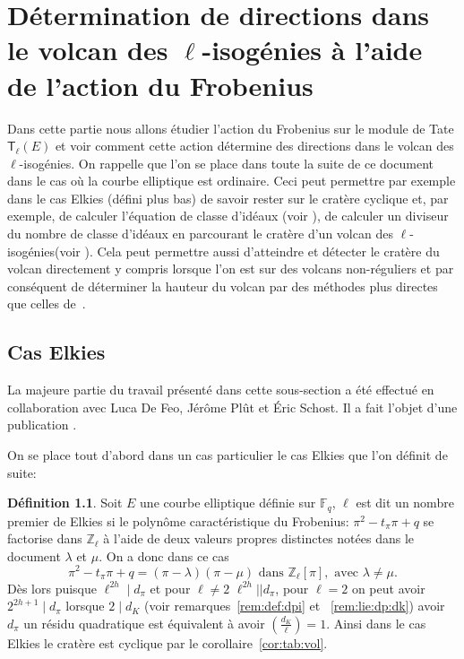 \documentclass[10pt,a4paper]{book}
\theoremstyle{plain}
\theoremstyle{definition}
\theoremstyle{definition}
\theoremstyle{definition}
\theoremstyle{definition}
\theoremstyle{definition}
\newtheorem{defi}[thm]{Définition}
\theoremstyle{remark}
\theoremstyle{remark}
\theoremstyle{definition}
\begin{document}
\chapter{Détermination de directions dans le volcan des $\ell$-isogénies à l'aide de l'action du Frobenius}
\label{cha:act:fro}
Dans cette partie nous allons étudier l'action du Frobenius sur  le module de
Tate $\mathsf{T}_{\ell}(E)$ et voir comment cette action  
détermine des directions dans le volcan des $\ell$-isogénies. On rappelle que 
l'on se place dans toute la suite de ce document dans le cas où la courbe 
elliptique est ordinaire. Ceci peut permettre par exemple dans le cas Elkies 
(défini plus bas) de savoir rester sur le cratère cyclique et, par exemple, de 
calculer l'équation de classe d'idéaux (voir 
\cite[Définition 2.3.1]{Fouquet01}), de calculer un diviseur du nombre de 
classe d'idéaux en parcourant le cratère d'un volcan des $\ell$-isogénies(voir 
\cite[§6.4]{Fouquet01}). Cela peut permettre aussi d'atteindre et détecter le 
cratère du volcan directement y compris lorsque l'on est sur des volcans 
non-réguliers et par conséquent de déterminer la hauteur du volcan par des 
méthodes plus directes que celles de~\cite{FouquetMorain02}.

\section{Cas Elkies}

La majeure partie du travail présenté dans cette sous-section a été effectué en
collaboration avec Luca De Feo, Jér\^ome Pl\^ut et \'Eric Schost. Il a fait 
l'objet d'une publication \cite{Defeo_Plut_Schost_2016}.

On se place tout d'abord dans un cas particulier le cas Elkies que l'on définit de suite: 

\begin{defi}
\label{def:cas:elk}
Soit $E$ une courbe elliptique définie sur $\mathbb{F}_q$, $\ell$ est dit un 
nombre premier de Elkies si le polynôme caractéristique du Frobenius: 
$\pi^2-t_{\pi}\pi + q$ se factorise dans $\mathbb{Z}_{\ell}$ à l'aide de deux 
valeurs propres distinctes notées dans le document $\lambda$ et $\mu$. On a 
donc dans ce cas
\begin{equation*}
\pi^2 - t_{\pi}\pi + q = (\pi - \lambda)(\pi - \mu) \text{ dans } \mathbb{Z}_{\ell}[\pi], \text{ avec } \lambda \neq \mu.
\end{equation*}
Dès lors puisque $\ell^{2h} \mid d_{\pi}$ et pour $\ell \neq 2$ $\ell^{2h}
|| d_{\pi}$, pour $\ell=2$ on peut avoir $2^{2h+1} \mid d_{\pi}$ lorsque $2 \mid d_K$ (voir remarques~\ref{rem:def:dpi} 
et ~\ref{rem:lie:dp:dk}) avoir $d_{\pi}$ un résidu quadratique est équivalent 
à avoir $\left( \frac{d_{K}}{\ell} \right)=1$. Ainsi dans le cas Elkies le 
cratère est cyclique par le corollaire~\ref{cor:tab:vol}.

\end{defi}
\end{document}
